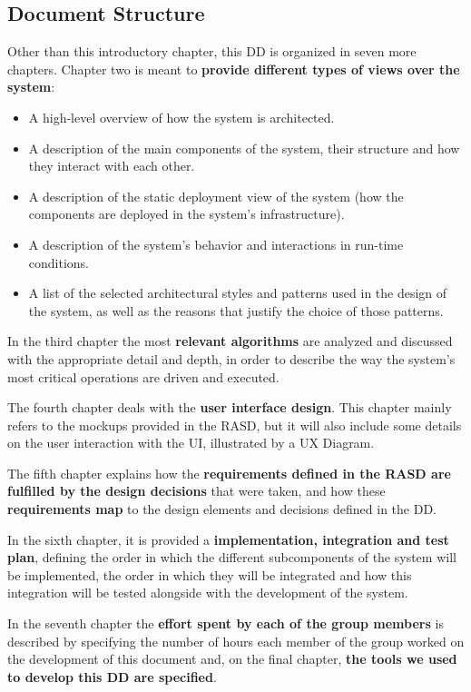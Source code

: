 \documentclass[12pt]{article}
\begin{document}
\subsection{Document Structure}

Other than this introductory chapter, this DD is organized in seven more chapters. Chapter two is meant to \textbf{provide different types of views over the system}:
\begin{itemize}
    \item A high-level overview of how the system is architected.
    \item A description of the main components of the system, their structure and how they interact with each other.
    \item A description of the static deployment view of the system (how the components are deployed in the system's infrastructure). 
    \item A description of the system's behavior and interactions in run-time conditions.
    \item A list of the selected architectural styles and patterns used in the design of the system, as well as the reasons that justify the choice of those patterns.
\end{itemize}

In the third chapter the most \textbf{relevant algorithms} are analyzed and discussed with the appropriate detail and depth, in order to describe the way the system's most critical operations are driven and executed.

The fourth chapter deals with the \textbf{user interface design}. This chapter mainly refers to the mockups provided in the RASD, but it will also include some details on the user interaction with the UI, illustrated by a UX Diagram.

The fifth chapter explains how the \textbf{requirements defined in the RASD are fulfilled by the design decisions} that were taken, and how these \textbf{requirements map} to the design elements and decisions defined in the DD.

In the sixth chapter, it is provided a \textbf{implementation, integration and test plan}, defining the order in which the different subcomponents of the system will be implemented, the order in which they will be integrated and how this integration will be tested alongside with the development of the system.

In the seventh chapter the \textbf{effort spent by each of the group members} is described by specifying the number of hours each member of the group worked on the development of this document and, on the final chapter, \textbf{the tools we used to develop this DD are specified}.
\end{document}
